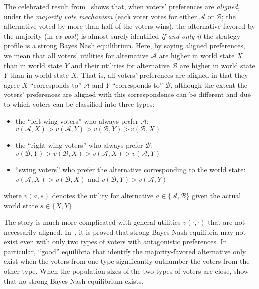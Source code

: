 The celebrated result from~\citet{han2023wisdom} shows that, when voters' preferences are \emph{aligned}, under the \emph{majority vote mechanism} (each voter votes for either $\mathcal{A}$ or $\mathcal{B}$; the alternative voted by more than half of the voters wins), the alternative favored by the majority (in \emph{ex-post}) is almost surely identified \emph{if and only if} the strategy profile is a strong Bayes Nash equilibrium.
Here, by saying aligned preferences, we mean that all voters' utilities for alternative $\mathcal{A}$ are higher in world state $X$ than in world state $Y$ and their utilities for alternative $\mathcal{B}$ are higher in world state $Y$ than in world state $X$.
That is, all voters' preferences are aligned in that they agree $X$ ``corresponds to'' $\mathcal{A}$ and $Y$ ``corresponds to'' $\mathcal{B}$, although the extent the voters' preferences are aligned with this correspondence can be different and due to which voters can be classified into three types:
\begin{itemize}
    \item the ``left-wing voters'' who always prefer $\mathcal{A}$: $v(\mathcal{A},X)>v(\mathcal{A},Y)>v(\mathcal{B},Y)>v(\mathcal{B},X)$
    \item the ``right-wing voters'' who always prefer $\mathcal{B}$: $v(\mathcal{B},Y)>v(\mathcal{B},X)>v(\mathcal{A},X)>v(\mathcal{A},Y)$
    \item  ``swing voters'' who prefer the alternative corresponding to the world state: $v(\mathcal{A},X)>v(\mathcal{B},X)$ and $v(\mathcal{B},Y)>v(\mathcal{A},Y)$
\end{itemize}
where $v(a,s)$ denotes the utility for alternative $a\in\{\mathcal{A},\mathcal{B}\}$ given the actual world state $s\in\{X,Y\}$.

The story is much more complicated with general utilities $v(\cdot,\cdot)$ that are not necessarily aligned.
In~\citet{deng2024aggregation}, it is proved that strong Bayes Nash equilibria may not exist even with only two types of voters with antagonistic preferences.
In particular, ``good'' equilibria that identify the majority-favored alternative only exist when the voters from one type significantly outnumber the voters from the other type.
When the population sizes of the two types of voters are close, \citet{deng2024aggregation} show that no strong Bayes Nash equilibrium exists.

